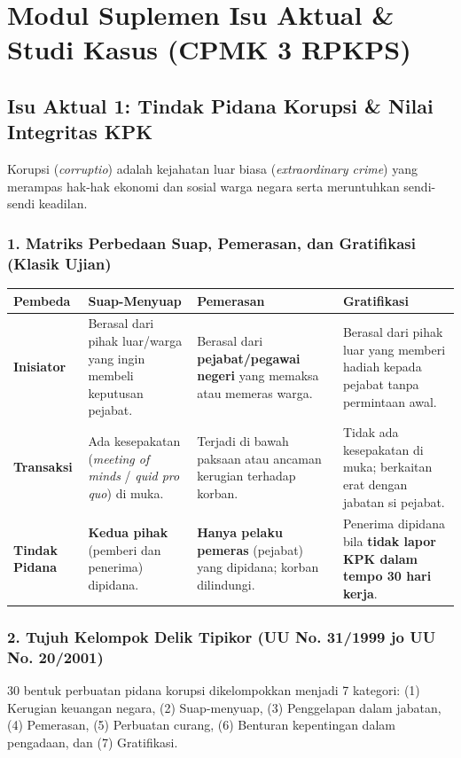\documentclass[10pt,a4paper]{article}
\begin{document}
\section{Modul Suplemen Isu Aktual \& Studi Kasus (CPMK 3 RPKPS)}

\subsection{Isu Aktual 1: Tindak Pidana Korupsi \& Nilai Integritas KPK}
Korupsi (\textit{corruptio}) adalah kejahatan luar biasa (\textit{extraordinary crime}) yang merampas hak-hak ekonomi dan sosial warga negara serta meruntuhkan sendi-sendi keadilan.

\subsubsection{1. Matriks Perbedaan Suap, Pemerasan, dan Gratifikasi (Klasik Ujian)}
\begin{tabularx}{\linewidth}{lYYY}
  \toprule
  \textbf{Pembeda} & \textbf{Suap-Menyuap} & \textbf{Pemerasan} & \textbf{Gratifikasi} \\
  \midrule
  \textbf{Inisiator} & Berasal dari pihak luar/warga yang ingin membeli keputusan pejabat. & Berasal dari \textbf{pejabat/pegawai negeri} yang memaksa atau memeras warga. & Berasal dari pihak luar yang memberi hadiah kepada pejabat tanpa permintaan awal. \\
  \textbf{Transaksi} & Ada kesepakatan (\textit{meeting of minds} / \textit{quid pro quo}) di muka. & Terjadi di bawah paksaan atau ancaman kerugian terhadap korban. & Tidak ada kesepakatan di muka; berkaitan erat dengan jabatan si pejabat. \\
  \textbf{Tindak Pidana} & \textbf{Kedua pihak} (pemberi dan penerima) dipidana. & \textbf{Hanya pelaku pemeras} (pejabat) yang dipidana; korban dilindungi. & Penerima dipidana bila \textbf{tidak lapor KPK dalam tempo 30 hari kerja}. \\
  \bottomrule
\end{tabularx}

\subsubsection{2. Tujuh Kelompok Delik Tipikor (UU No. 31/1999 jo UU No. 20/2001)}
30 bentuk perbuatan pidana korupsi dikelompokkan menjadi 7 kategori: (1) Kerugian keuangan negara, (2) Suap-menyuap, (3) Penggelapan dalam jabatan, (4) Pemerasan, (5) Perbuatan curang, (6) Benturan kepentingan dalam pengadaan, dan (7) Gratifikasi.
\end{document}
